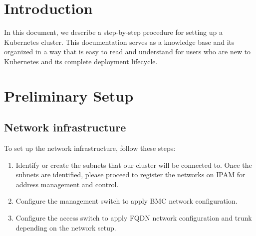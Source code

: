 \section{Introduction}
In this document, we describe a step-by-step procedure for setting up a Kubernetes cluster. This documentation serves as a knowledge base and its organized in a way that is easy to read and understand for users who are new to Kubernetes and its complete deployment lifecycle.

\section{Preliminary Setup}
\subsection{Network infrastructure}
To set up the network infrastructure, follow these steps:
\begin{enumerate}
    \item Identify or create the subnets that our cluster will be connected to. Once the subnets are identified, please proceed to register the networks on IPAM  for address management and control.
    
    \item Configure the management switch to apply BMC network configuration.

    \item Configure the access switch to apply FQDN network configuration and trunk depending on the network setup.
\end{enumerate}

\vfill\eject

